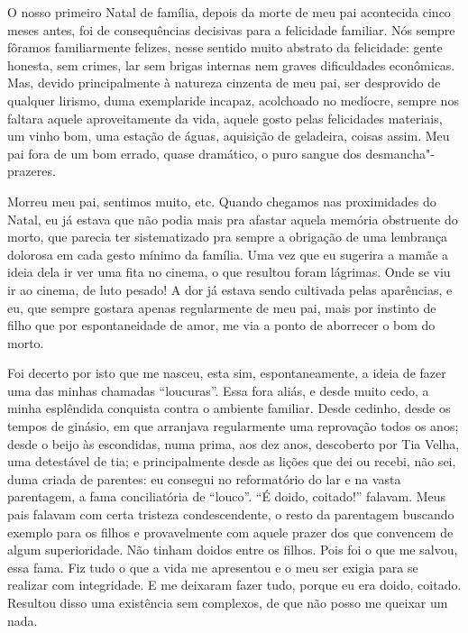 \begin{linenumbers}
O nosso primeiro Natal de família, depois da morte de meu pai acontecida
cinco meses antes, foi de consequências decisivas para a felicidade
familiar. Nós sempre fôramos familiarmente felizes, nesse sentido muito
abstrato da felicidade: gente honesta, sem crimes, lar sem brigas
internas nem graves dificuldades econômicas. Mas, devido principalmente
à natureza cinzenta de meu pai, ser desprovido de qualquer lirismo, duma
exemplaride incapaz, acolchoado no medíocre, sempre nos faltara aquele
aproveitamente da vida, aquele gosto pelas felicidades materiais, um
vinho bom, uma estação de águas, aquisição de geladeira, coisas assim.
Meu pai fora de um bom errado, quase dramático, o puro sangue dos
desmancha"-prazeres.

Morreu meu pai, sentimos muito, etc. Quando chegamos nas proximidades do
Natal, eu já estava que não podia mais pra afastar aquela memória
obstruente do morto, que parecia ter sistematizado pra sempre a
obrigação de uma lembrança dolorosa em cada gesto mínimo da família. Uma
vez que eu sugerira a mamãe a ideia dela ir ver uma fita no cinema, o
que resultou foram lágrimas. Onde se viu ir ao cinema, de luto pesado! A
dor já estava sendo cultivada pelas aparências, e eu, que sempre gostara
apenas regularmente de meu pai, mais por instinto de filho que por
espontaneidade de amor, me via a ponto de aborrecer o bom do morto.

Foi decerto por isto que me nasceu, esta sim, espontaneamente, a ideia
de fazer uma das minhas chamadas ``loucuras''. Essa fora aliás, e desde
muito cedo, a minha esplêndida conquista contra o ambiente familiar.
Desde cedinho, desde os tempos de ginásio, em que arranjava regularmente
uma reprovação todos os anos; desde o beijo às escondidas, numa prima,
aos dez anos, descoberto por Tia Velha, uma detestável de tia; e
principalmente desde as lições que dei ou recebi, não sei, duma criada
de parentes: eu consegui no reformatório do lar e na vasta parentagem, a
fama conciliatória de ``louco''. ``É doido, coitado!'' falavam. Meus
pais falavam com certa tristeza condescendente, o resto da parentagem
buscando exemplo para os filhos e provavelmente com aquele prazer dos
que convencem de algum superioridade. Não tinham doidos entre os filhos.
Pois foi o que me salvou, essa fama. Fiz tudo o que a vida me apresentou
e o meu ser exigia para se realizar com integridade. E me deixaram fazer
tudo, porque eu era doido, coitado. Resultou disso uma existência sem
complexos, de que não posso me queixar um nada.


\end{linenumbers}
